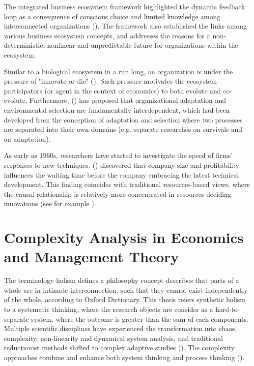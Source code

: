 \documentclass[utf8,english]{gradu3}
\begin{document}
The integrated business ecosystem framework highlighted the dynamic feedback loop as a consequence of conscious choice and limited knowledge among interconnected organizations (\cite{peltoniemi2006preliminary}). The framework also established the links among various business ecosystem concepts, and addresses the reasons for a non-deterministic, nonlinear and unpredictable future for organizations within the ecosystem.

Similar to a biological ecosystem in a run long, an organization is under the pressure of "innovate or die" (\cite{drucker1999knowledge}). Such pressure motivates the ecosystem participators (or agent in the context of economics) to both evolute and co-evolute. Furthermore, \citeauthor{levinthal1991organizational} (\citeyear{levinthal1991organizational}) has proposed that organizational adaptation and environmental selection are fundamentally interdependent, which had been developed from the conception of adaptation and selection where two processes are separated into their own domains (e.g. separate researches on survivals and on adaptation).

As early as 1960s, researchers have started to investigate the speed of firms' responses to new techniques. \citeauthor{mansfield1963speed} (\citeyear{mansfield1963speed}) discovered that company size and profitability influences the waiting time before the company embracing the latest technical development. This finding coincides with traditional resources-based views, where the causal relationship is relatively more concentrated in resources deciding innovations (see for example \cite{wernerfelt1984resource}).

\section{Complexity Analysis in Economics and Management Theory}

The terminology holism defines a philosophy concept describes that parts of a whole are in intimate interconnection, such that they cannot exist independently of the whole, according to Oxford Dictionary. This thesis refers synthetic holism to a systematic thinking, where the research objects are consider as a hard-to-separate system, where the outcome is greater than the sum of each components. Multiple scientific disciplines have experienced the transformation into chaos, complexity, non-linearity and dynamical system analysis, and traditional reductionist methods shifted to complex adaptive studies (\cite{urry2005complexity}). The complexity approaches combine and enhance both system thinking and process thinking (\cite{thrift1999place}). 
\end{document}
